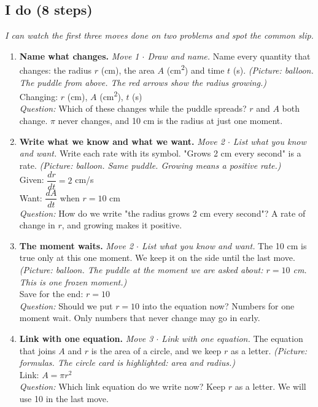 \documentclass[11pt]{article}
\begin{document}
\subsection*{I do (8 steps)}
\textit{I can watch the first three moves done on two problems and spot the common slip.}\par
\begin{enumerate}
\item \textbf{Name what changes.} \textit{Move 1 $\cdot$ Draw and name.} Name every quantity that changes: the radius $r$ (cm), the area $A$ (cm\textsuperscript{2}) and time $t$ (s). \textit{(Picture: balloon. The puddle from above. The red arrows show the radius growing.)}\\ Changing: $r$ (cm), $A$ (cm\textsuperscript{2}), $t$ (s)\\ \textit{Question:} Which of these changes while the puddle spreads?  $r$ and $A$ both change. $\pi$ never changes, and 10 cm is the radius at just one moment.
\item \textbf{Write what we know and what we want.} \textit{Move 2 $\cdot$ List what you know and want.} Write each rate with its symbol. "Grows 2 cm every second" is a rate. \textit{(Picture: balloon. Same puddle. Growing means a positive rate.)}\\ Given: $\dfrac{dr}{dt}=2$ cm/s\\ Want: $\dfrac{dA}{dt}$ when $r=10$ cm\\ \textit{Question:} How do we write "the radius grows 2 cm every second"?  A rate of change in $r$, and growing makes it positive.
\item \textbf{The moment waits.} \textit{Move 2 $\cdot$ List what you know and want.} The 10 cm is true only at this one moment. We keep it on the side until the last move. \textit{(Picture: balloon. The puddle at the moment we are asked about: $r=10$ cm. This is one frozen moment.)}\\ Save for the end: $r=10$\\ \textit{Question:} Should we put $r=10$ into the equation now?  Numbers for one moment wait. Only numbers that never change may go in early.
\item \textbf{Link with one equation.} \textit{Move 3 $\cdot$ Link with one equation.} The equation that joins $A$ and $r$ is the area of a circle, and we keep $r$ as a letter. \textit{(Picture: formulas. The circle card is highlighted: area and radius.)}\\ Link: $A=\pi r^2$\\ \textit{Question:} Which link equation do we write now?  Keep $r$ as a letter. We will use 10 in the last move.

\end{enumerate}
\end{document}
